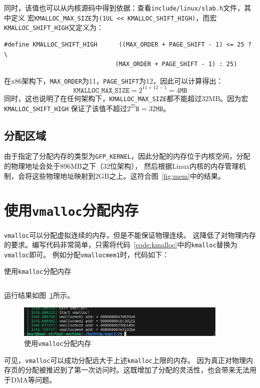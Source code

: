 \documentclass[a4paper,twoside]{article}
\begin{document}
\begin{spacing}{1.2}
同时，该值也可以从内核源码中得到依据：查看\texttt{include/linux/slab.h}文件，其中定义
宏\texttt{KMALLOC\_MAX\_SIZE}为\texttt{(1UL << KMALLOC\_SHIFT\_HIGH)}，而宏
\texttt{KMALLOC\_SHIFT\_HIGH}又定义为：
\begin{verbatim}
#define KMALLOC_SHIFT_HIGH      ((MAX_ORDER + PAGE_SHIFT - 1) <= 25 ? \
                               (MAX_ORDER + PAGE_SHIFT - 1) : 25)
\end{verbatim}
在x86架构下，\texttt{MAX\_ORDER}为11，\texttt{PAGE\_SHIFT}为12，因此可以计算得出：
\begin{equation}
	\texttt{KMALLOC\_MAX\_SIZE} = 2^{11+12-1} = 4\texttt{MB}
\end{equation}
同时，这也说明了在任何架构下，\texttt{KMALLOC\_MAX\_SIZE}都不能超过32MB。因为宏\texttt{KMALLOC\_SHIFT\_HIGH}
保证了该值不超过$2^{25}\texttt{B}=32\texttt{MB}$。

\subsection{分配区域}

由于指定了分配内存的类型为\texttt{GFP\_KERNEL}，因此分配的内存位于内核空间，分配的物理地址会处于896MB之下（32位架构），
然后根据Linux内核的内存管理机制，会将这些物理地址映射到2GB之上。这符合图~\ref{fig:mem}中的结果。

\section{使用\texttt{vmalloc}分配内存}

\texttt{vmalloc}可以分配虚拟连续的内存，但是不能保证物理连续。
这降低了对物理内存的要求。编写代码非常简单，只需将代码~\ref{code:kmalloc}中的\texttt{kmalloc}替换为\texttt{vmalloc}即可。
例如分配\texttt{vmallocmem1}时，代码如下：
\begin{listing}[htb]
	\caption{使用\texttt{kmalloc}分配内存}
	\label{code:kmalloc}
	\inputminted[firstline=17,lastline=22]{c}{../code/2/2.c}
\end{listing}

运行结果如图~\ref{fig:vmalloc}所示。
\begin{figure}[htb]
	\centering
	\caption{使用\texttt{vmalloc}分配内存}
	\label{fig:vmalloc}
	\includegraphics[width=0.9\textwidth]{images/vm.png}
\end{figure}
可见，\texttt{vmalloc}可以成功分配远大于上述\texttt{kmalloc}上限的内存。
因为真正对物理内存页的分配被推迟到了第一次访问时。这既增加了分配的灵活性，也会带来无法用于DMA等问题。


\end{spacing}
\end{document}
